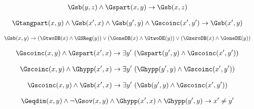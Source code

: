 \begin{erin}
    \begin{align*}
        \Gsb(y,z) \wedge \Gspart(x,y) \to \Gsb(x,z)
    \end{align*}
\end{erin}

\begin{erin}
    \begin{align*}
        \Gtangpart(x,y) \wedge \Gsb(x',x) \wedge \Gsb(y',y) \wedge \Gscoinc(x',y') \to \Gsb(x',y)
    \end{align*}
\end{erin}
                
\begin{erin}
    \begin{align*}
        \Gsb(x,y) \to (\GtwoDB(x) \wedge \GSReg(y)) \vee (\GoneDB(x) \wedge \GtwoDE(y)) \vee (\GzeroDB(x) \wedge \GoneDE(y))
    \end{align*}
\end{erin}

\begin{erin}
    \begin{align*}
        \Gscoinc(x,y) \wedge \Gspart(x',x) \to \exists y' \ (\Gspart(y',y) \wedge \Gscoinc(x',y'))
    \end{align*}
\end{erin}

\begin{erin}
    \begin{align*}
        \Gscoinc(x,y) \wedge \Ghypp(x',x) \to \exists y' \ (\Ghypp(y',y) \wedge \Gscoinc(x',y'))
    \end{align*}
\end{erin}

\begin{erin}
    \begin{align*}
        \Gscoinc(x,y) \wedge \Gsb(x',x) \to \exists y' \ (\Gsb(y',y) \wedge \Gscoinc(x',y'))
    \end{align*}
\end{erin}

\begin{erin}[A30.]
    \begin{align*}
        \Geqdim(x,y) \wedge \neg\Gsov(x,y) \wedge \Ghypp(x',x) \wedge \Ghypp(y',y) \to x' \neq y'
    \end{align*}
\end{erin}
                
